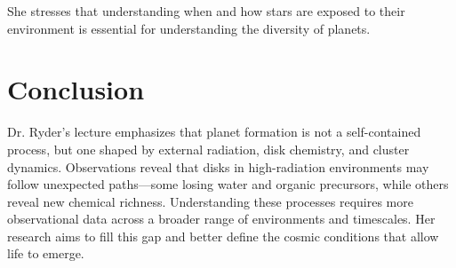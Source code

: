 \documentclass[12pt]{article}
\begin{document}
She stresses that understanding when and how stars are exposed to their environment is essential for understanding the diversity of planets.

\section*{Conclusion}
Dr. Ryder’s lecture emphasizes that planet formation is not a self-contained process, but one shaped by external radiation, disk chemistry, and cluster dynamics. Observations reveal that disks in high-radiation environments may follow unexpected paths---some losing water and organic precursors, while others reveal new chemical richness. Understanding these processes requires more observational data across a broader range of environments and timescales. Her research aims to fill this gap and better define the cosmic conditions that allow life to emerge.
\end{document}

